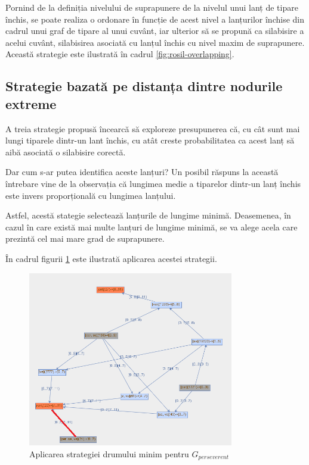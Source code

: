 Pornind de la definiția nivelului de suprapunere de la nivelul unui lanț de tipare închis, se poate realiza o ordonare în funcție de acest nivel a lanțurilor închise din cadrul unui graf de tipare al unui cuvânt, iar ulterior să se propună ca silabisire a acelui cuvânt, silabisirea asociată cu lanțul închis cu nivel maxim de suprapunere. Această strategie este ilustrată în cadrul \ref{fig:rosil-overlapping}.




\subsection{Strategie bazată pe distanța dintre nodurile extreme}

A treia strategie propusă încearcă să exploreze presupunerea că, cu cât sunt mai lungi tiparele dintr-un lant închis, cu atât creste probabilitatea ca acest lanț să aibă asociată o silabisire corectă.

Dar cum s-ar putea identifica aceste lanțuri? Un posibil răspuns la această întrebare vine de la observația că lungimea medie a tiparelor dintr-un lanț închis este invers proporțională cu lungimea lanțului. 

Astfel, acestă stategie selectează lanțurile de lungime minimă. Deasemenea, în cazul în care există mai multe lanțuri de lungime minimă, se va alege acela care prezintă cel mai mare grad de suprapunere. 

\begin{ex}
În cadrul figurii \ref{fig:rosil-shortest} este ilustrată aplicarea acestei strategii. 
\end{ex}

\begin{figure}[h]
    \centering
    \includegraphics[width=0.8\textwidth]{figures/rosil-shortest.png}
    \caption{Aplicarea strategiei drumului minim pentru $G_{perseverent}$}
    \label{fig:rosil-shortest}
\end{figure}

